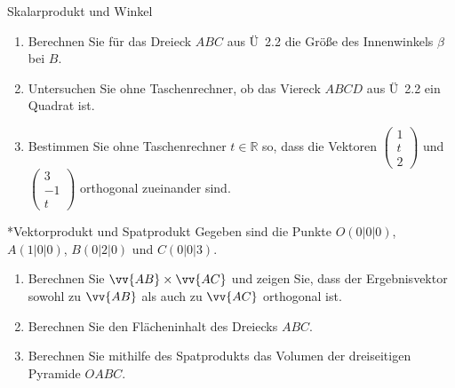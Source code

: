 \begin{uebung}{Skalarprodukt und Winkel}
\begin{enumerate}[label=\alph*)]
  \item Berechnen Sie für das Dreieck $ABC$ aus Ü~2.2 die Größe des Innenwinkels $\beta$ bei $B$.
  \item Untersuchen Sie ohne Taschenrechner, ob das Viereck $ABCD$ aus Ü~2.2 ein Quadrat ist.
  \item Bestimmen Sie ohne Taschenrechner $t\in\mathds{R}$ so, dass die Vektoren $\begin{pmatrix} 1\\ t\\ 2\end{pmatrix}$ und $\begin{pmatrix} 3\\ -1\\ t\end{pmatrix}$ orthogonal zueinander sind.
\end{enumerate}
\end{uebung}

\begin{uebung}*{Vektorprodukt und Spatprodukt}
Gegeben sind die Punkte $O(0|0|0)$, $A(1|0|0)$, $B(0|2|0)$ und $C(0|0|3)$.
\begin{enumerate}[label=\alph*)]
  \item Berechnen Sie $\vv{AB}\times\vv{AC}$ und zeigen Sie, dass der Ergebnisvektor sowohl zu $\vv{AB}$ als auch zu $\vv{AC}$ orthogonal ist.
  \item Berechnen Sie den Flächeninhalt des Dreiecks $ABC$.
  \item Berechnen Sie mithilfe des Spatprodukts das Volumen der dreiseitigen Pyramide $OABC$.
\end{enumerate}
\end{uebung}


